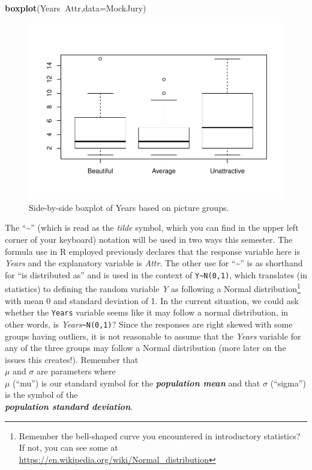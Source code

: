 \documentclass[]{book}
\newenvironment{Shaded}{\begin{snugshade}}{\end{snugshade}}
\newcommand{\KeywordTok}[1]{\textcolor[rgb]{0.13,0.29,0.53}{\textbf{#1}}}
\newcommand{\DataTypeTok}[1]{\textcolor[rgb]{0.13,0.29,0.53}{#1}}
\newcommand{\OperatorTok}[1]{\textcolor[rgb]{0.81,0.36,0.00}{\textbf{#1}}}
\newcommand{\NormalTok}[1]{#1}
\let\rmarkdownfootnote\footnote%
\def\footnote{\protect\rmarkdownfootnote}
\begin{document}
\begin{Shaded}
\begin{Highlighting}[]
\KeywordTok{boxplot}\NormalTok{(Years}\OperatorTok{~}\NormalTok{Attr,}\DataTypeTok{data=}\NormalTok{MockJury)}
\end{Highlighting}
\end{Shaded}

\begin{figure}
\centering
\includegraphics{GreenwoodBanner_files/figure-latex/Figure2-4-1.pdf}
\caption{\label{fig:Figure2-4}Side-by-side boxplot of Years based on picture groups.}
\end{figure}

The ``\textasciitilde{}'' (which is read as the \emph{tilde} symbol,
which you can find in the upper left corner of your keyboard) notation
will be used in two ways this semester. The formula use in R employed
previously declares that the response variable here is \emph{Years} and
the explanatory variable is \emph{Attr}. The other use for
``\textasciitilde{}'' is as shorthand for ``is distributed as'' and is
used in the context of \texttt{Y\textasciitilde{}N(0,1)}, which
translates (in statistics) to defining the random variable \emph{Y} as
following a Normal distribution\footnote{Remember the bell-shaped curve
  you encountered in introductory statistics? If not, you can see some
  at \url{https://en.wikipedia.org/wiki/Normal_distribution}} with mean
0 and standard deviation of 1. In the current situation, we could ask
whether the \texttt{Years} variable seems like it may follow a normal
distribution, in other words, is
\emph{Years}\texttt{\textasciitilde{}N(0,1)}? Since the responses are
right skewed with some groups having outliers, it is not reasonable to
assume that the \emph{Years} variable for any of the three groups may
follow a Normal distribution (more later on the issues this creates!).
Remember that\\
\(\mu\) and \(\sigma\) are parameters where\\
\(\mu\) (``mu'') is our standard symbol for the \textbf{\emph{population
mean}} and that \(\sigma\) (``sigma'') is the symbol of the\\
\textbf{\emph{population standard deviation}}.
\end{document}

